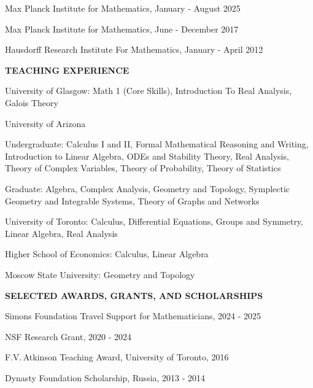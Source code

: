 \documentclass[a4paper, 12pt]{article}
\begin{document}
\begin{compactitem}
 \item Max Planck Institute for Mathematics, January - August 2025
 \item Max Planck Institute for Mathematics, June - December 2017
\item Hausdorff Research Institute For Mathematics, January - April 2012 %
\end{compactitem}
\par\quad\par\smallskip
\textbf{TEACHING EXPERIENCE}\par\smallskip
\begin{compactitem}
\item University of Glasgow:  Math 1 (Core Skills),  Introduction To Real Analysis, Galois Theory
\item University of Arizona \begin{compactitem} \item Undergraduate: Calculus I and II, Formal Mathematical Reasoning and Writing,  Introduction to Linear Algebra, ODEs and Stability Theory, Real Analysis, Theory of Complex Variables, Theory of Probability, Theory of Statistics \item Graduate: Algebra, Complex Analysis, Geometry and Topology, Symplectic Geometry and Integrable Systems, Theory of Graphs and Networks\end{compactitem}
\item University of Toronto: Calculus, Differential Equations, Groups and Symmetry, Linear Algebra, Real Analysis
\item Higher School of Economics: Calculus, Linear Algebra
\item Moscow State University: Geometry and Topology
\end{compactitem}
\par\quad\par\smallskip
\textbf{SELECTED AWARDS, GRANTS, AND SCHOLARSHIPS}\par\smallskip
\begin{compactitem}
\item Simons Foundation Travel Support for Mathematicians, 2024 - 2025
\item NSF Research Grant, 2020 - 2024
\item  F.V.\,Atkinson Teaching Award, University of Toronto, 2016
\item Dynasty Foundation Scholarship, Russia, 2013 - 2014 
\end{compactitem}
\par\quad\par\smallskip 
\end{document}
